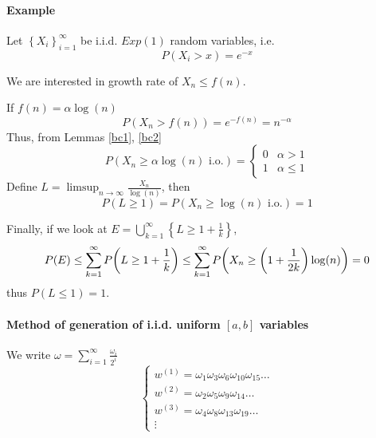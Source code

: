 \paragraph{Example}
Let $\left\{ X_i \right\}_{i=1}^\infty$ be i.i.d. $Exp(1)$ random variables, i.e. 
$$P(X_i>x) = e^{-x}$$

We are interested in growth rate of $X_n \leq f(n)$.

If $f(n) = \alpha \log(n)$
$$P(X_n > f(n)) = e^{-f(n)} = n^{-\alpha}$$
Thus, from Lemmas \ref{bc1}, \ref{bc2}
$$P(X_n \geq \alpha \log(n) \text{ i.o.}) = \begin{cases}
0 & \alpha > 1\\
1 & \alpha \leq 1
\end{cases}$$
Define $L = \limsup_{n\to \infty} \frac{X_n}{\log(n)} $, then
$$P(L\geq 1) = P(X_n \geq \log(n) \text{ i.o.}) = 1$$

Finally, if we look at $E = \bigcup_{k=1}^\infty \left\{ L \geq 1+ \frac{1}{k} \right\}$,
$$P(E)  \leq \sum_{k=1}^\infty P\qty( L \geq 1+ \frac{1}{k}) \leq \sum_{k=1}^\infty P\qty( X_n \geq \qty(1+ \frac{1}{2k})\log(n)) = 0 $$
thus $P(L\leq 1)=1$.

\paragraph{Method of generation of i.i.d. uniform $[a,b]$ variables}

We write $\omega = \sum_{i=1}^\infty \frac{\omega_i}{2^i}$
$$\begin{cases}
w^{(1)} = \omega_1\omega_3\omega_6\omega_{10}\omega_{15}\dots\\
w^{(2)} = \omega_2\omega_5\omega_{9}\omega_{14}\dots\\
w^{(3)} = \omega_4\omega_8\omega_{13}\omega_{19}\dots\\
\vdots
\end{cases}$$